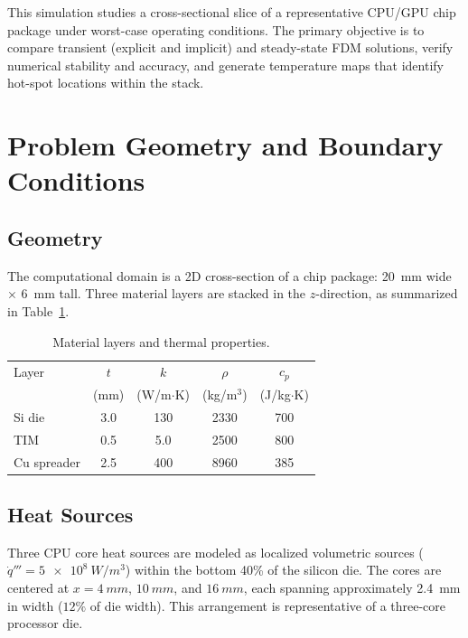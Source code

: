 \documentclass[10pt,twocolumn]{article}
\begin{document}
This simulation studies a cross-sectional slice of a representative
CPU/GPU chip package under worst-case operating conditions. The primary
objective is to compare transient (explicit and implicit) and steady-state
FDM solutions, verify numerical stability and accuracy, and generate
temperature maps that identify hot-spot locations within the stack.

\section{Problem Geometry and Boundary Conditions}

\subsection{Geometry}

The computational domain is a 2D cross-section of a chip package:
\SI{20}{mm} wide $\times$ \SI{6}{mm} tall. Three material layers are
stacked in the $z$-direction, as summarized in Table~\ref{tab:layers}.

\begin{table}[H]
  \centering
  \caption{Material layers and thermal properties.}
  \label{tab:layers}
  \small
  \begin{tabular}{@{}lcccc@{}}
    \toprule
    Layer & $t$ & $k$ & $\rho$ & $c_p$ \\
          & (mm) & (W/m$\cdot$K) & (kg/m$^3$) & (J/kg$\cdot$K) \\
    \midrule
    Si die      & 3.0 & 130 & 2330 & 700 \\
    TIM         & 0.5 & 5.0 & 2500 & 800 \\
    Cu spreader & 2.5 & 400 & 8960 & 385 \\
    \bottomrule
  \end{tabular}
\end{table}

\subsection{Heat Sources}

Three CPU core heat sources are modeled as localized volumetric sources
($\dot{q}''' = \SI{5e8}{W/m^3}$) within the bottom 40\% of the silicon
die. The cores are centered at $x = \SI{4}{mm}$, $\SI{10}{mm}$, and
$\SI{16}{mm}$, each spanning approximately \SI{2.4}{mm} in width
($12\%$ of die width). This arrangement is representative of a three-core
processor die.
\end{document}
